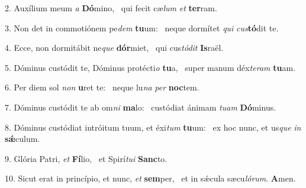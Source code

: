 2. Auxílium meum \textit{a} \textbf{Dó}mino, \ast\  qui fecit cæ\textit{lum} \textit{et} \textbf{ter}ram.\

3. Non det in commotiónem pe\textit{dem} \textbf{tu}um: \ast\  neque dormítet \textit{qui} \textit{cus}\textbf{tó}dit te.\

4. Ecce, non dormitábit ne\textit{que} \textbf{dór}miet, \ast\  qui cus\textit{tó}\textit{dit} \textbf{Is}raël.\

5. Dóminus custódit te, Dóminus protécti\textit{o} \textbf{tu}a, \ast\  super manum déx\textit{te}\textit{ram} \textbf{tu}am.\

6. Per diem sol \textit{non} \textbf{u}ret te: \ast\  neque lu\textit{na} \textit{per} \textbf{noc}tem.\

7. Dóminus custódit te ab om\textit{ni} \textbf{ma}lo: \ast\  custódiat ánimam \textit{tu}\textit{am} \textbf{Dó}minus.\

8. Dóminus custódiat intróitum tuum, et éxi\textit{tum} \textbf{tu}um: \ast\  ex hoc nunc, et us\textit{que} \textit{in} \textbf{sǽ}culum.\

9. Glória Patri, \textit{et} \textbf{Fí}lio, \ast\  et Spirí\textit{tu}\textit{i} \textbf{Sanc}to.\

10. Sicut erat in princípio, et nunc, \textit{et} \textbf{sem}per, \ast\  et in sǽcula sæcu\textit{ló}\textit{rum}. \textbf{A}men.\

